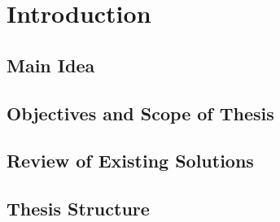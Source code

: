 \chapter{Introduction}
\section{Main Idea}
\section{Objectives and Scope of Thesis}
\section{Review of Existing Solutions}
\section{Thesis Structure}

\cite{flutter}
\cite{flutter-ui}
\cite{dart}
\cite{flutter-tutorial}
\cite{nashorn}
\cite{sqlite}
\cite{javascript}
\cite{nashorn}
